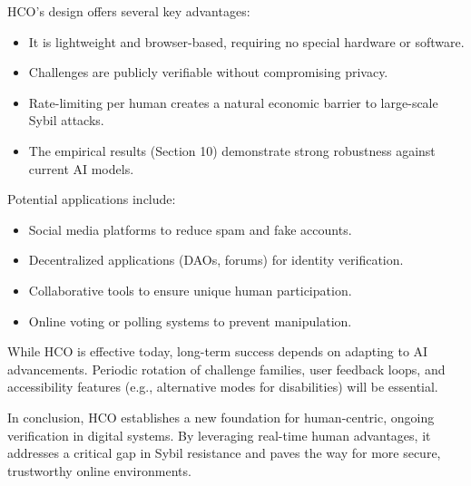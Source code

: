 \documentclass[sigconf,nonacm]{acmart}
\begin{document}
HCO's design offers several key advantages:
\begin{itemize}
	\item It is lightweight and browser-based, requiring no special hardware or software.
	\item Challenges are publicly verifiable without compromising privacy.
	\item Rate-limiting per human creates a natural economic barrier to large-scale Sybil attacks.
	\item The empirical results (Section 10) demonstrate strong robustness against current AI models.
\end{itemize}

Potential applications include:
\begin{itemize}
	\item Social media platforms to reduce spam and fake accounts.
	\item Decentralized applications (DAOs, forums) for identity verification.
	\item Collaborative tools to ensure unique human participation.
	\item Online voting or polling systems to prevent manipulation.
\end{itemize}

While HCO is effective today, long-term success depends on adapting to AI advancements. Periodic rotation of challenge families, user feedback loops, and accessibility features (e.g., alternative modes for disabilities) will be essential.

In conclusion, HCO establishes a new foundation for human-centric, ongoing verification in digital systems. By leveraging real-time human advantages, it addresses a critical gap in Sybil resistance and paves the way for more secure, trustworthy online environments.


\end{document}
